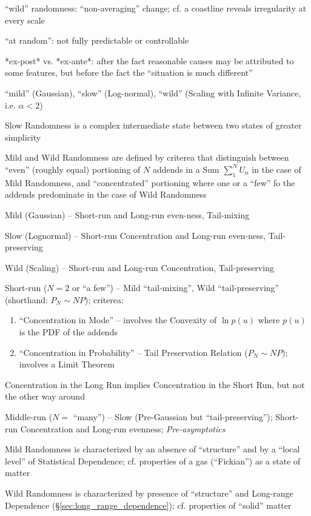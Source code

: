 ``wild'' randomness: ``non-averaging'' change; cf. a coastline reveals
irregularity at every scale

``at random'': not fully predictable or controllable

*ex-post* vs. *ex-ante*: after the fact reasonable causes may be attributed to
some features, but before the fact the ``situation is much different''

``mild'' (Gaussian), ``slow'' (Log-normal), ``wild'' (Scaling with Infinite
Variance, i.e. $\alpha < 2$)

Slow Randomness is a complex intermediate state between two states of greater
simplicity

Mild and Wild Randomness are defined by criterea that distinguish between
``even'' (roughly equal) portioning of $N$ addends in a Sum $\sum_1^N U_n$ in
the case of Mild Randomness, and ``concentrated'' portioning where one or a
``few'' fo the addends predominate in the case of Wild Randomness

Mild (Gaussian) -- Short-run and Long-run even-ness, Tail-mixing

Slow (Lognormal) -- Short-run Concentration and Long-run even-ness,
Tail-preserving

Wild (Scaling) -- Short-run and Long-run Concentration, Tail-preserving

Short-run ($N=2$ or ``a few'') -- Mild ``tail-mixing'', Wild
``tail-preserving'' (shorthand: $P_N \sim N P$); criterea:
\begin{enumerate}
  \item ``Concentration in Mode'' -- involves the Convexity of $\ln p(u)$ where
    $p(u)$ is the PDF of the addends
  \item ``Concentration in Probability'' -- Tail Preservation Relation
    ($P_N \sim N P$); involves a Limit Theorem
\end{enumerate}

Concentration in the Long Run implies Concentration in the Short Run, but not
the other way around

Middle-run ($N =$ ``many'') -- Slow (Pre-Gaussian but ``tail-preserving'');
Short-run Concentration and Long-run evenness; \emph{Pre-asymptotics}

Mild Randomness is characterized by an absence of ``structure'' and by a ``local
level'' of Statistical Dependence; cf. properties of a gas (``Fickian'') as a
state of matter

Wild Randomness is characterized by presence of ``structure'' and Long-range
Dependence (\S\ref{sec:long_range_dependence}); cf. properties of ``solid''
matter

